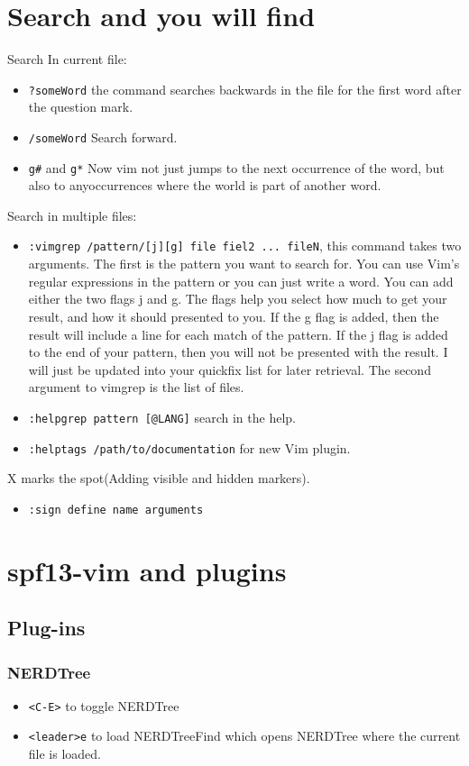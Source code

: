 \documentclass[11pt]{book}
\begin{document}
 \chapter{Search and you will find}
 Search In current file:
 \begin{itemize}
 \item \verb|?someWord| the command searches backwards in the file for the first
 word after the question mark.
 \item \verb|/someWord| Search forward.
 \item \verb|g#| and \verb|g*| Now vim not just jumps to the next occurrence of
 the word, but also to anyoccurrences where the world is part of another word.
 \end{itemize}
 Search in multiple files:
 \begin{itemize}
 \item \verb|:vimgrep /pattern/[j][g] file fiel2 ... fileN|, this command takes
 two arguments. The first is the pattern you want to search for. You can use
 Vim's regular expressions in the pattern or you can just write a word. You can
 add either the two flags j and g. The flags help you select how much to get
 your result, and how it should presented to you. If the g flag is added, then
 the result will include a line for each match of the pattern. If the j flag is
 added to the end of your pattern, then you will not be presented with the
 result. I will just be updated into your quickfix list for later retrieval. The
 second argument to vimgrep is the list of files.
 \item \verb|:helpgrep pattern [@LANG]| search in the help.
 \item \verb|:helptags /path/to/documentation| for new Vim plugin.
 \end{itemize}
 X marks the spot(Adding visible and hidden markers).
 \begin{itemize}
 \item \verb|:sign define name arguments|
 \end{itemize}
 \chapter{spf13-vim and plugins}
 \section{Plug-ins}
 \subsection{NERDTree}
 \begin{itemize}
        \item \verb|<C-E>| to toggle NERDTree
        \item \verb|<leader>e| to load NERDTreeFind which opens NERDTree where 
             the current file is loaded.
 \end{itemize}
\end{document}
